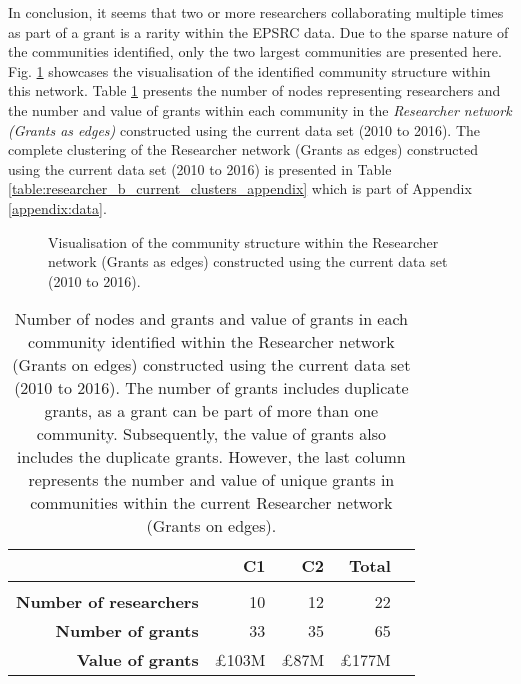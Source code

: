 {In conclusion, it seems that two or more researchers collaborating multiple times as part of a grant is a rarity within the EPSRC data. Due to the sparse nature of the communities identified, only the two largest communities are presented here. Fig. \ref{fig:researcher_b_current_cs} showcases the visualisation of the identified community structure within this network. Table \ref{table:researcher_b_current_numbers} presents the number of nodes representing researchers and the number and value of grants within each community in the \textit{Researcher network (Grants as edges)} constructed using the current data set (2010 to 2016). The complete clustering of the Researcher network (Grants as edges) constructed using the current data set (2010 to 2016) is presented in Table \ref{table:researcher_b_current_clusters_appendix} which is part of Appendix \ref{appendix:data}.

\begin{figure}[htpb]
    \centering
    \caption[Visualisation of the community structure within the Researcher network (Grants as edges) constructed using the current data set (2010 to 2016).]{Visualisation of the community structure within the Researcher network (Grants as edges) constructed using the current data set (2010 to 2016).}
    \label{fig:researcher_b_current_cs}
\end{figure}

\begin{table}[!htbp]
\centering
\caption[Number of nodes and grants and value of grants in each community within the Researcher network (Grants as edges) constructed using the current data set (2010 to 2016).]{Number of nodes and grants and value of grants in each community identified within the Researcher network (Grants on edges) constructed using the current data set (2010 to 2016). The number of grants includes duplicate grants, as a grant can be part of more than one community. Subsequently, the value of grants also includes the duplicate grants. However, the last column represents the number and value of unique grants in communities within the current Researcher network (Grants on edges).}
\label{table:researcher_b_current_numbers}
\begin{tabular}{r|rrrr}
{} & \textbf{C1} & \textbf{C2} & \textbf{Total}\\
\hline\\
\textbf{Number of researchers} & {10} & {12} & {22}\\
\textbf{Number of grants}      & {33} & {35} & {65}\\
\textbf{Value of grants} & {\pounds103M} & {\pounds87M} & {\pounds177M}\\
\end{tabular}
\end{table}

}

